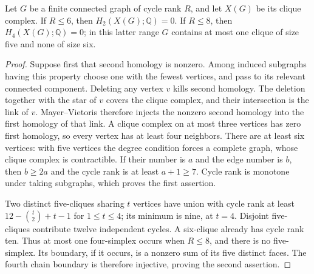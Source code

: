 \begin{lemma}
\label{CP2:A-high-flag}
Let $G$ be a finite connected graph of cycle rank $R$, and let $X(G)$
be its clique complex.  If $R\leq6$, then
$H_2(X(G);\mathbb Q)=0$.  If $R\leq8$, then
$H_4(X(G);\mathbb Q)=0$; in this latter range $G$ contains at most
one clique of size five and none of size six.
\end{lemma}
\begin{proof}
Suppose first that second homology is nonzero.  Among induced
subgraphs having this property choose one with the fewest vertices,
and pass to its relevant connected component.  Deleting any vertex
$v$ kills second homology.  The deletion together with the star of
$v$ covers the clique complex, and their intersection is the link
of $v$.  Mayer--Vietoris therefore injects the nonzero second
homology into the first homology of that link.  A clique complex
on at most three vertices has zero first homology, so every vertex
has at least four neighbors.  There are at least six vertices:
with five vertices the degree condition forces a complete graph,
whose clique complex is contractible.  If their number is $a$ and
the edge number is $b$, then $b\geq2a$ and the cycle rank is at
least $a+1\geq7$.  Cycle rank is monotone under taking subgraphs,
which proves the first assertion.

Two distinct five-cliques sharing $t$ vertices have union with
cycle rank at least $12-\binom t2+t-1$ for $1\leq t\leq4$;
its minimum is nine, at $t=4$.  Disjoint five-cliques contribute
twelve independent cycles.  A six-clique already has cycle rank
ten.  Thus at most one four-simplex occurs when $R\leq8$, and
there is no five-simplex.  Its boundary, if it occurs, is a nonzero
sum of its five distinct faces.  The fourth chain boundary is
therefore injective, proving the second assertion.
\end{proof}


